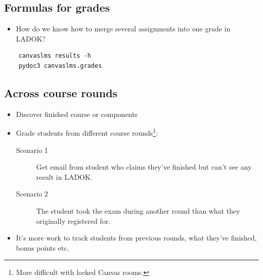 \subsection{Formulas for grades}

\begin{frame}[fragile]
  \begin{question}
    \begin{itemize}
      \item How do we know how to merge several assignments into one grade in 
        LADOK?
    \end{itemize}
  \end{question}

  \pause
  
  \begin{solution}
  \begin{verbatim}
    canvaslms results -h
    pydoc3 canvaslms.grades
  \end{verbatim}
  \end{solution}
\end{frame}

\subsection{Across course rounds}

\begin{frame}
  \begin{example}
    \begin{itemize}
      \item {Discover finished course or components}
      \item {Grade students from different course rounds}\footnote{%
          More difficult with locked Canvas rooms.
        }:
        \begin{description}
          \item[Scenario 1] {Get email from student who claims they've 
            finished but can't see any result in LADOK.}

          \item[Scenario 2] The student took the exam during another round than 
            what they originally registered for.
        \end{description}

      \item {It's more work to track students from previous rounds, 
        what they've finished, bonus points etc.}
    \end{itemize}
  \end{example}
\end{frame}

